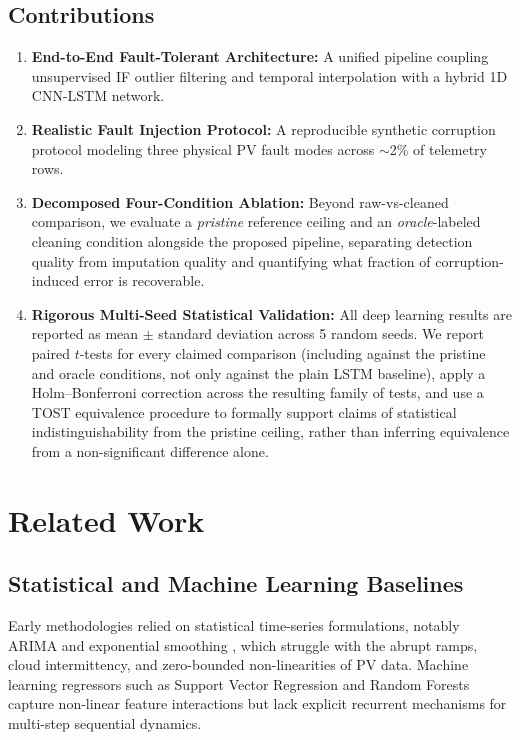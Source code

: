 \documentclass[conference]{IEEEtran}
\begin{document}
\subsection*{Contributions}
\begin{enumerate}
    \item \textbf{End-to-End Fault-Tolerant Architecture:} A unified pipeline coupling unsupervised IF outlier filtering and temporal interpolation with a hybrid 1D CNN-LSTM network.
    \item \textbf{Realistic Fault Injection Protocol:} A reproducible synthetic corruption protocol modeling three physical PV fault modes across $\sim$2\% of telemetry rows.
    \item \textbf{Decomposed Four-Condition Ablation:} Beyond raw-vs-cleaned comparison, we evaluate a \emph{pristine} reference ceiling and an \emph{oracle}-labeled cleaning condition alongside the proposed pipeline, separating detection quality from imputation quality and quantifying what fraction of corruption-induced error is recoverable.
    \item \textbf{Rigorous Multi-Seed Statistical Validation:} All deep learning results are reported as mean $\pm$ standard deviation across 5 random seeds. We report paired $t$-tests for every claimed comparison (including against the pristine and oracle conditions, not only against the plain LSTM baseline), apply a Holm--Bonferroni correction across the resulting family of tests, and use a TOST equivalence procedure to formally support claims of statistical indistinguishability from the pristine ceiling, rather than inferring equivalence from a non-significant difference alone.
\end{enumerate}

\section{Related Work}

\subsection{Statistical and Machine Learning Baselines}
Early methodologies relied on statistical time-series formulations, notably ARIMA and exponential smoothing \cite{sobri2018review, zhang2015baseline}, which struggle with the abrupt ramps, cloud intermittency, and zero-bounded non-linearities of PV data. Machine learning regressors such as Support Vector Regression and Random Forests capture non-linear feature interactions \cite{abumohsen2024hybrid} but lack explicit recurrent mechanisms for multi-step sequential dynamics.
\end{document}

